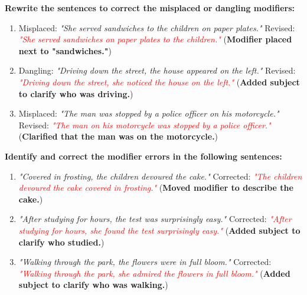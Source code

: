 \documentclass[12pt]{article}
\begin{document}
\begin{tcolorbox}[colframe=black!60, colback=white, 
coltitle=black, colbacktitle=black!15, fonttitle=\bfseries\Large, 
title=Guided Practice, halign title=center, left=10pt, right=10pt, top=10pt, bottom=15pt]
\textbf{Rewrite the sentences to correct the misplaced or dangling modifiers:}
\begin{enumerate}[itemsep=3em]
    \item Misplaced: \textit{"She served sandwiches to the children on paper plates."}  
    Revised: \textcolor{red}{\textit{"She served sandwiches on paper plates to the children."}} (\textbf{Modifier placed next to "sandwiches."})

    \item Dangling: \textit{"Driving down the street, the house appeared on the left."}  
    Revised: \textcolor{red}{\textit{"Driving down the street, she noticed the house on the left."}} (\textbf{Added subject to clarify who was driving.})

    \item Misplaced: \textit{"The man was stopped by a police officer on his motorcycle."}  
    Revised: \textcolor{red}{\textit{"The man on his motorcycle was stopped by a police officer."}} (\textbf{Clarified that the man was on the motorcycle.})
\end{enumerate}
\end{tcolorbox}

\vspace{1em}

\begin{tcolorbox}[colframe=black!60, colback=white, 
coltitle=black, colbacktitle=black!15, fonttitle=\bfseries\Large, 
title=Editing Exercises, halign title=center, left=10pt, right=10pt, top=10pt, bottom=15pt]
\textbf{Identify and correct the modifier errors in the following sentences:}
\begin{enumerate}[itemsep=3em]
    \item \textit{"Covered in frosting, the children devoured the cake."}  
    Corrected: \textcolor{red}{\textit{"The children devoured the cake covered in frosting."}} (\textbf{Moved modifier to describe the cake.})

    \item \textit{"After studying for hours, the test was surprisingly easy."}  
    Corrected: \textcolor{red}{\textit{"After studying for hours, she found the test surprisingly easy."}} (\textbf{Added subject to clarify who studied.})

    \item \textit{"Walking through the park, the flowers were in full bloom."}  
    Corrected: \textcolor{red}{\textit{"Walking through the park, she admired the flowers in full bloom."}} (\textbf{Added subject to clarify who was walking.})
\end{enumerate}
\end{tcolorbox}
\end{document}
